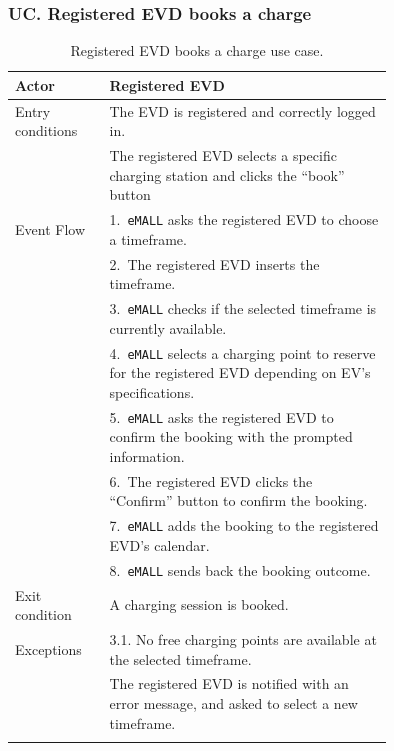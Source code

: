 \subsubsection*{UC\cuc . Registered EVD books a charge}
\begin{center}
    \begin{longtable}{lp{0.75\linewidth}}
        \hline
        Actor            & Registered EVD                                                                                         \\
        \hline
        Entry conditions & The EVD is registered and correctly logged in.                                                         \\
        & The registered EVD selects a specific charging station and clicks the ``book'' button                  \\
        \hline
        Event Flow       & 1.\ \verb|eMALL| asks the registered EVD to choose a timeframe.                                               \\
        & 2.\ The registered EVD inserts the timeframe.                                                          \\
        & 3.\ \verb|eMALL| checks if the selected timeframe is currently available.                                     \\
        & 4.\ \verb|eMALL| selects a charging point to reserve for the registered EVD depending on EV's specifications. \\
        & 5.\ \verb|eMALL| asks the registered EVD to confirm the booking with the prompted information.                \\
        & 6.\ The registered EVD clicks the ``Confirm'' button to confirm the booking.                           \\
        & 7.\ \verb|eMALL| adds the booking to the registered EVD's calendar.                                           \\
        & 8.\ \verb|eMALL| sends back the booking outcome.                                                              \\
        \hline
        Exit condition   & A charging session is booked.                                                                          \\
        \hline
        Exceptions       & 3.1. No free charging points are available at the selected timeframe.                                  \\
        & The registered EVD is notified with an error message, and asked to select a new timeframe.             \\
        \hline
        \caption{Registered EVD books a charge use case.}
        \label{tab: EVD_booking_use_case}
    \end{longtable}


\end{center}
